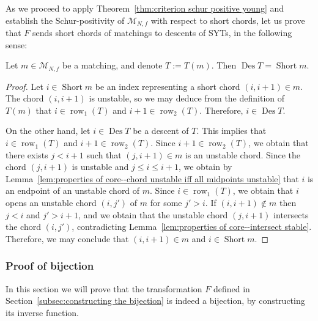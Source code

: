 \documentclass[ALCO]{cedram}
\newcommand{\Des}{\operatorname{Des}}
\newcommand{\Short}{\operatorname{Short}}
\newcommand{\row}{\operatorname{row}}
\newcommand{\M}{\mathcal{M}}
\begin{document}
As we proceed to apply Theorem~\ref{thm:criterion schur positive young} and establish the Schur-positivity of $\M_{N,f}$ with respect to short chords, let us prove that $F$ sends short chords of matchings to descents of SYTs, in the following sense:

\begin{proposition}
\label{prop:F statistic preserving}
    Let $m \in \M_{N,f}$ be a matching, and denote $T := T(m)$. Then $\Des T = \Short m$.
\end{proposition}
\begin{proof}
    Let $i \in \Short m$ be an index representing a short chord $(i,i+1) \in m$. The chord $(i,i+1)$ is unstable, so we may deduce from the definition of $T(m)$ that $i \in \row_1(T)$ and $i+1 \in \row_2(T)$. Therefore, $i \in \Des T$.
    
    On the other hand, let $i \in \Des T$ be a descent of $T$. This implies that $i \in \row_1(T)$ and $i+1 \in \row_2(T)$. Since $i+1 \in \row_2(T)$, we obtain that there exists $j < i+1$ such that $(j,i+1) \in m$ is an unstable chord. Since the chord $(j,i+1)$ is unstable and $j \le i \le i+1$, we obtain by Lemma~\ref{lem:properties of core--chord unstable iff all midpoints unstable} that $i$ is an endpoint of an unstable chord of $m$. Since $i \in \row_1(T)$, we obtain that $i$ opens an unstable chord $(i,j')$ of $m$ for some $j'>i$.
    If $(i,i+1) \notin m$ then $j<i$ and $j' > i+1$, and we obtain that the unstable chord $(j,i+1)$ intersects the chord $(i,j')$, contradicting Lemma~\ref{lem:properties of core--intersect stable}. Therefore, we may conclude that $(i,i+1) \in m$ and $i \in \Short m$.
\end{proof}




\subsubsection{Proof of bijection}
\label{subsec:proof of bijection}

In this section we will prove that the transformation $F$ defined in Section~\ref{subsec:constructing the bijection} is indeed a bijection, by constructing its inverse function.
\end{document}
